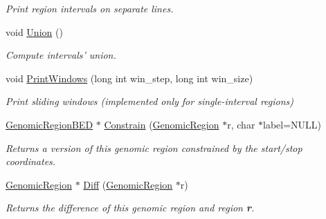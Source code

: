 \begin{DoxyCompactItemize}
\begin{DoxyCompactList}\small\item\em Print region intervals on separate lines. \end{DoxyCompactList}\item 
\hypertarget{classGenomicRegionBED_a605f5bf86254547d117ed0c3f5c64587}{
void \hyperlink{classGenomicRegionBED_a605f5bf86254547d117ed0c3f5c64587}{Union} ()}
\label{classGenomicRegionBED_a605f5bf86254547d117ed0c3f5c64587}

\begin{DoxyCompactList}\small\item\em Compute intervals' union. \end{DoxyCompactList}\item 
\hypertarget{classGenomicRegionBED_a3ebdc24dd97c7b106205d932970de535}{
void \hyperlink{classGenomicRegionBED_a3ebdc24dd97c7b106205d932970de535}{PrintWindows} (long int win\_\-step, long int win\_\-size)}
\label{classGenomicRegionBED_a3ebdc24dd97c7b106205d932970de535}

\begin{DoxyCompactList}\small\item\em Print sliding windows (implemented only for single-\/interval regions) \end{DoxyCompactList}\item 
\hypertarget{classGenomicRegionBED_a0c4b2a8a590ce1dfbef142d03d53fe5d}{
\hyperlink{classGenomicRegionBED}{GenomicRegionBED} $\ast$ \hyperlink{classGenomicRegionBED_a0c4b2a8a590ce1dfbef142d03d53fe5d}{Constrain} (\hyperlink{classGenomicRegion}{GenomicRegion} $\ast$r, char $\ast$label=NULL)}
\label{classGenomicRegionBED_a0c4b2a8a590ce1dfbef142d03d53fe5d}

\begin{DoxyCompactList}\small\item\em Returns a version of this genomic region constrained by the start/stop coordinates. \end{DoxyCompactList}\item 
\hypertarget{classGenomicRegionBED_a6db4aa9e6d1655bf116095d295b27269}{
\hyperlink{classGenomicRegion}{GenomicRegion} $\ast$ \hyperlink{classGenomicRegionBED_a6db4aa9e6d1655bf116095d295b27269}{Diff} (\hyperlink{classGenomicRegion}{GenomicRegion} $\ast$r)}
\label{classGenomicRegionBED_a6db4aa9e6d1655bf116095d295b27269}

\begin{DoxyCompactList}\small\item\em Returns the difference of this genomic region and region {\bfseries r}. \end{DoxyCompactList}\end{DoxyCompactItemize}

